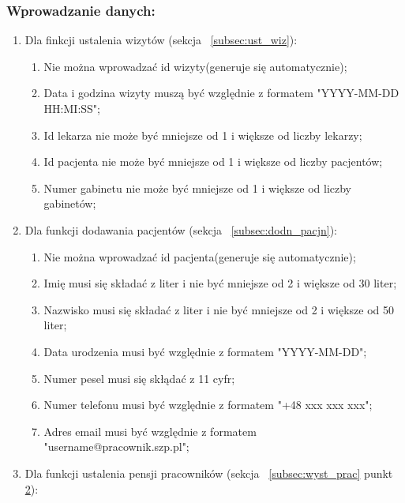 \begin{flushleft}
    \subsubsection{\large{Wprowadzanie danych: }}
    \renewcommand{\labelenumii}{\alph{enumii})}
    \begin{enumerate}
        \item{Dla finkcji ustalenia wizytów (sekcja ~\ref{subsec:ust_wiz}):
        \begin{enumerate}
            \item{Nie można wprowadzać id wizyty(generuje się automatycznie);}
            \item{Data i godzina wizyty muszą być względnie z formatem "YYYY-MM-DD HH:MI:SS";}
            \item{Id lekarza nie może być mniejsze od 1 i większe od liczby lekarzy;}
            \item{Id pacjenta nie może być mniejsze od 1 i większe od liczby pacjentów;}
            \item{Numer gabinetu nie może być mniejsze od 1 i większe od liczby gabinetów;}
        \end{enumerate}}
        \item{Dla funkcji dodawania pacjentów (sekcja ~\ref{subsec:dodn_pacjn}):\label{item:zabr_dodn_prac}
        \begin{enumerate}
            \item{Nie można wprowadzać id pacjenta(generuje się automatycznie);\label{item:zabr_dodn_prac_a}}
            \item{Imię musi się składać z liter i nie być mniejsze od 2 i większe od 30 liter;}
            \item{Nazwisko musi się składać z liter i nie być mniejsze od 2 i większe od 50 liter;}
            \item{Data urodzenia musi być względnie z formatem "YYYY-MM-DD";}
            \item{Numer pesel musi się skłądać z 11 cyfr;}
            \item{Numer telefonu musi być względnie z formatem "+48 xxx xxx xxx";}
            \item{Adres email musi być względnie z formatem "username@pracownik.szp.pl";}
        \end{enumerate}}
        \item{Dla funkcji ustalenia pensji pracowników (sekcja ~\ref{subsec:wyst_prac} punkt \hyperref[item:pens_prac]{2}):\\
}
\end{enumerate}
\end{flushleft}
